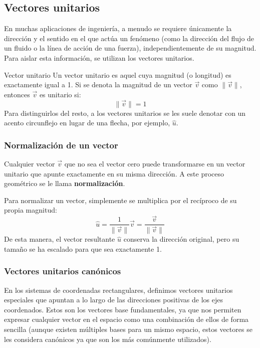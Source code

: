 \subsection{Vectores unitarios}

En muchas aplicaciones de ingeniería, a menudo se requiere únicamente la dirección y el sentido en el que actúa un fenómeno (como la dirección del flujo de un fluido o la línea de acción de una fuerza), independientemente de su magnitud. Para aislar esta información, se utilizan los vectores unitarios.

\begin{mydefinition}{Vector unitario}
Un vector unitario es aquel cuya magnitud (o longitud) es exactamente igual a 1. Si se denota la magnitud de un vector $\vec{v}$ como $\|\vec{v}\|$, entonces $\vec{v}$ es unitario si:
\[ \|\vec{v}\| = 1 \]
Para distinguirlos del resto, a los vectores unitarios se les suele denotar con un acento circunflejo en lugar de una flecha, por ejemplo, $\hat{u}$.
\end{mydefinition}

\subsubsection{Normalización de un vector}

Cualquier vector $\vec{v}$ que no sea el vector cero puede transformarse en un vector unitario que apunte exactamente en su misma dirección. A este proceso geométrico se le llama \textbf{normalización}. 

Para normalizar un vector, simplemente se multiplica por el recíproco de su propia magnitud:
\[ \hat{u} = \frac{1}{\|\vec{v}\|} \vec{v} = \frac{\vec{v}}{\|\vec{v}\|} \]
De esta manera, el vector resultante $\hat{u}$ conserva la dirección original, pero su tamaño se ha escalado para que sea exactamente 1.

\subsubsection{Vectores unitarios canónicos}

En los sistemas de coordenadas rectangulares, definimos vectores unitarios especiales que apuntan a lo largo de las direcciones positivas de los ejes coordenados. Estos son los vectores base fundamentales, ya que nos permiten expresar cualquier vector en el espacio como una combinación de ellos de forma sencilla (aunque existen múltiples bases para un mismo espacio, estos vectores se les considera canónicos ya que son los más comúnmente utilizados).


